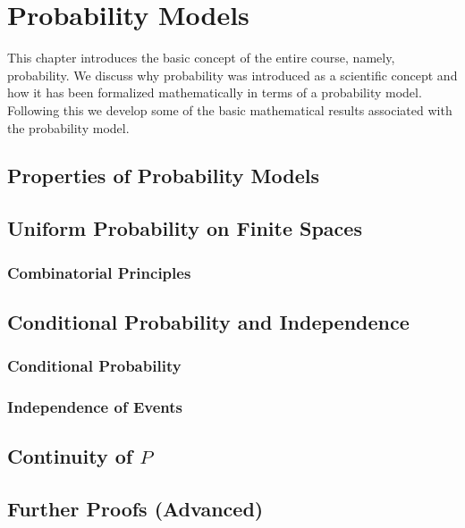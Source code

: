 \chapter{Probability Models}\label{chap:probability_models}
\minitoc
This chapter introduces the basic concept of the entire course, namely, probability. We discuss why probability was introduced as a scientific concept and how it has been formalized mathematically in terms of a probability model. Following this we develop some of the basic mathematical results associated with the probability model.





\section{Properties of Probability Models}
\lipsum[1-10]

\section{Uniform Probability on Finite Spaces}
\lipsum[1-10]

\subsection{Combinatorial Principles}
\lipsum[1-10]

\section{Conditional Probability and Independence}
\lipsum[1-10]

\subsection{Conditional Probability}
\lipsum[1-10]

\subsection{Independence of Events}
\lipsum[1-10]

\section{Continuity of $P$}
\lipsum[1-10]

\section{Further Proofs (Advanced)}
\lipsum[1-10]
